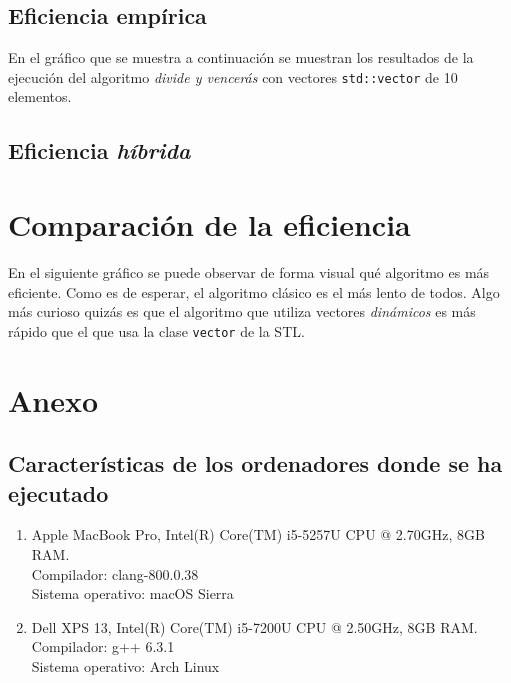 \documentclass[11pt]{article}
\begin{document}
\subsection*{Eficiencia empírica}

En el gráfico que se muestra a continuación se muestran los resultados de la
ejecución del algoritmo \textit{divide y vencerás} con vectores
\texttt{std::vector} de 10 elementos.

\begin{center}
	
\end{center}

\subsection*{Eficiencia \textit{híbrida}}

\section*{Comparación de la eficiencia}

En el siguiente gráfico se puede observar de forma visual qué algoritmo es más
eficiente. Como es de esperar, el algoritmo clásico es el más lento de
todos. Algo más curioso quizás es que el algoritmo que utiliza vectores
\textit{dinámicos} es más rápido que el que usa la clase \texttt{vector} de la STL.

\begin{center}
	
\end{center}




\newpage

\section*{Anexo}
\subsection*{Características de los ordenadores donde se ha ejecutado}

\vspace{0.5em}

\begin{enumerate}
\item Apple MacBook Pro, Intel(R) Core(TM) i5-5257U CPU @ 2.70GHz, 8GB RAM.\\  Compilador: clang-800.0.38 \\
  Sistema operativo: macOS Sierra
\item Dell XPS 13, Intel(R) Core(TM) i5-7200U CPU @ 2.50GHz, 8GB RAM.\\
  Compilador: g++ 6.3.1\\
  Sistema operativo: Arch Linux
\end{enumerate}
\end{document}
